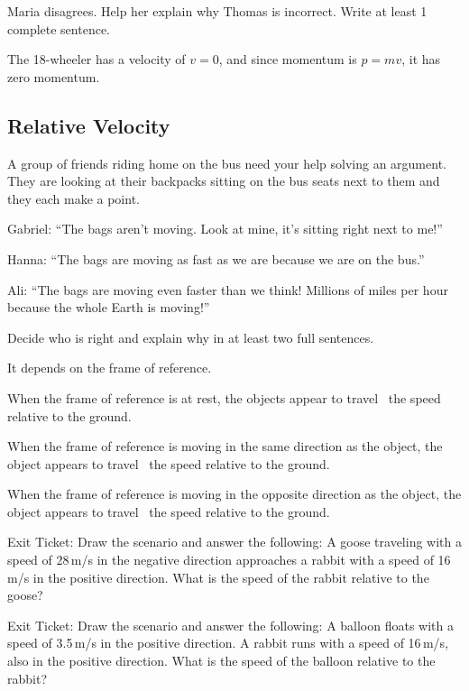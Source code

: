 \documentclass[answers]{exam}
\begin{document}
\begin{questions}
Maria disagrees. Help her explain why Thomas is incorrect. Write at least 1 complete sentence.

\begin{solution}
    The 18-wheeler has a velocity of $v = 0$, and since momentum is $p = mv$, it has zero momentum. 
\end{solution}

\clearpage
\begin{EnvUplevel}
    \subsection{Relative Velocity}
\end{EnvUplevel}

\question
A group of friends riding home on the bus need your help solving an argument. They are looking at their backpacks sitting on the bus seats next to them and they each make a point. 

Gabriel: ``The bags aren't moving. Look at mine, it’s sitting right next to me!''

Hanna: ``The bags are moving as fast as we are because we are on the bus.''

Ali: ``The bags are moving even faster than we think! Millions of miles per hour because the whole Earth is moving!''

Decide who is right and explain why in at least two full sentences.

\begin{solution}
    It depends on the frame of reference.
\end{solution}


\question
When the frame of reference is at rest, the objects appear to travel \fillin[equal to]\ the speed relative to the ground.

\question
When the frame of reference is moving in the same direction as the object, the object appears to travel \ the speed relative to the ground.

\question
When the frame of reference is moving in the opposite direction as the object, the object appears to travel \ the speed relative to the ground.

\question
Exit Ticket: Draw the scenario and answer the following: A goose traveling with a speed of 28\,m/s in the negative direction approaches a rabbit with a speed of 16\,m/s in the positive direction. What is the speed of the rabbit relative to the goose?

\question
Exit Ticket:  Draw the scenario and answer the following: A balloon floats with a speed of 3.5\,m/s in the positive direction.  A rabbit runs with a speed of 16\,m/s, also in the positive direction.  What is the speed of the balloon relative to the rabbit?



\end{questions}
\end{document}
